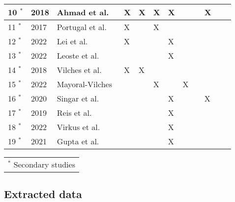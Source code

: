 \begin{table}[h]
\begin{tabularx}{\textwidth}{|l|l|X|l|l|l|l|l|l|l|l|l|}
    10 $^{\ast}$ & 2018          & Ahmad et al.~\cite[]{analyzing_cyber_physical_threats_2018}                 & X          & X & X & X &  &  & X \\\hline
    11 $^{\ast}$ & 2017          & Portugal et al.~\cite[]{role_of_security_in_human_robot_2017}               & X &  & X &  &  &  &  \\\hline
    12 $^{\ast}$ & 2022          & Lei et al.~\cite[]{acceptance_telepresence_robots_2022}                     & X          &            &            & X          &  &  &  \\\hline
    13 $^{\ast}$ & 2022          & Leoste et al.~\cite[]{higher_edu_perception_on_tprs_2022}                   &            &            &            & X &  &  &  \\\hline
    14 $^{\ast}$ & 2018          & Vilches et al.~\cite[]{robot_security_framework_2018}                       & X          & X          &            &            &            &            &            \\\hline
    15 $^{\ast}$ & 2022          & Mayoral-Vilches~\cite[]{robot_security_review_2022}                         &            &            & X          &            & X          &            &            \\\hline
    16 $^{\ast}$ & 2020          & Singar et al.~\cite[]{role_of_cyber_security_in_higher_edu_2020} &  &  &  & X &  &  & X \\\hline
    17 $^{\ast}$ & 2019          & Reis et al.~\cite[]{telepresence_robots_in_classroom_2019}                  &            &            &            & X &  &  &  \\\hline
    18 $^{\ast}$ & 2022          & Virkus et al.~\cite[]{telepresence_perspective_psychology_educational_2022} &  &  &  & X &  &  &  \\\hline
    19 $^{\ast}$ & 2021          & Gupta et al.~\cite[]{humans_and_robots_relation_2021}                       &            &            &            & X          &            &            &            \\\hline

  \end{tabularx}
  \begin{tabularx}{\textwidth}{X}
    \footnotesize{$^{\ast}$ Secondary studies}\\
  \end{tabularx}
\end{table}

\subsection{Extracted data}\label{subsec:extracted-data}

